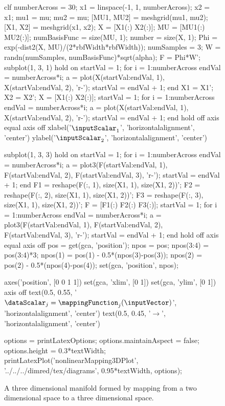 \begin{figure}
  \begin{matlab}
    clf
    numberAcross = 30;
    x1 = linspace(-1, 1, numberAcross);
    x2 = x1;
    mu1 = mu;
    mu2 = mu;
    [MU1, MU2] = meshgrid(mu1, mu2);
    [X1, X2] = meshgrid(x1, x2);
    X = [X1(:) X2(:)];
    MU = [MU1(:) MU2(:)];
    numBasisFunc = size(MU, 1);
    number = size(X, 1);
    Phi = exp(-dist2(X, MU)/(2*rbfWidth*rbfWidth));
    numSamples = 3;
    W = randn(numSamples, numBasisFunc)*sqrt(alpha);
    F = Phi*W';
    subplot(1, 3, 1)
    hold on
    startVal = 1;
    for i = 1:numberAcross
      endVal = numberAcross*i;
      a = plot(X(startVal:endVal, 1), X(startVal:endVal, 2), 'r-');
      startVal = endVal + 1;
    end
    X1 = X1';
    X2 = X2';
    X = [X1(:) X2(:)];
    startVal = 1;
    for i = 1:numberAcross
      endVal = numberAcross*i;
      a = plot(X(startVal:endVal, 1), X(startVal:endVal, 2), 'r-');
      startVal = endVal + 1;
    end
    hold off
    axis equal
    axis off
    xlabel('$\inputScalar_1$', 'horizontalalignment', 'center')
    ylabel('$\inputScalar_2$', 'horizontalalignment', 'center')
  
    subplot(1, 3, 3)
    hold on
    startVal = 1;
    for i = 1:numberAcross
      endVal = numberAcross*i;
      a = plot3(F(startVal:endVal, 1), F(startVal:endVal, 2), F(startVal:endVal, 3), 'r-');
      startVal = endVal + 1;
    end
    F1 = reshape(F(:, 1), size(X1, 1), size(X1, 2))';
    F2 = reshape(F(:, 2), size(X1, 1), size(X1, 2))';
    F3 = reshape(F(:, 3), size(X1, 1), size(X1, 2))';
    F = [F1(:) F2(:) F3(:)];
    startVal = 1;
    for i = 1:numberAcross
      endVal = numberAcross*i;
      a = plot3(F(startVal:endVal, 1), F(startVal:endVal, 2), F(startVal:endVal, 3), 'r-');
      startVal = endVal + 1;
    end
    hold off
    axis equal
    axis off
    pos = get(gca, 'position');
    npos = pos;
    npos(3:4) = pos(3:4)*3;
    npos(1) = pos(1) - 0.5*(npos(3)-pos(3));
    npos(2) = pos(2) - 0.5*(npos(4)-pos(4));
    set(gca, 'position', npos);

    axes('position', [0 0 1 1])
    set(gca, 'xlim', [0 1])
    set(gca, 'ylim', [0 1])
    axis off
    text(0.5, 0.55, '\large$\dataScalar_j = \mappingFunction_j(\inputVector)$', 'horizontalalignment', 'center')
    text(0.5, 0.45, '\LARGE$\longrightarrow$', 'horizontalalignment', 'center')


    options = printLatexOptions;
    options.maintainAspect = false;
    options.height = 0.3*textWidth;
    printLatexPlot('nonlinearMapping3DPlot', '../../../dimred/tex/diagrams', 0.95*textWidth, options);

  \end{matlab}
  \begin{center}
    
  \end{center}
  \caption{A three dimensional manifold formed by mapping from a two dimensional space to a three dimensional space.}\label{fig:sampleManifold}
\end{figure}


